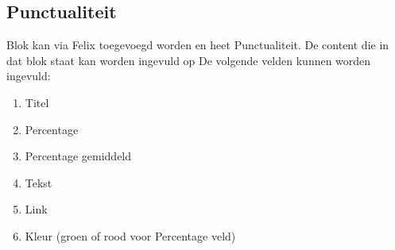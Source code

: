 \subsection{Punctualiteit}

Blok kan via Felix toegevoegd worden en heet Punctualiteit. De content die in dat blok staat kan worden ingevuld op  De volgende velden kunnen worden ingevuld:

\begin{enumerate}
\item Titel
\item Percentage
\item Percentage gemiddeld
\item Tekst
\item Link
\item Kleur (groen of rood voor Percentage veld)
\end{enumerate}

